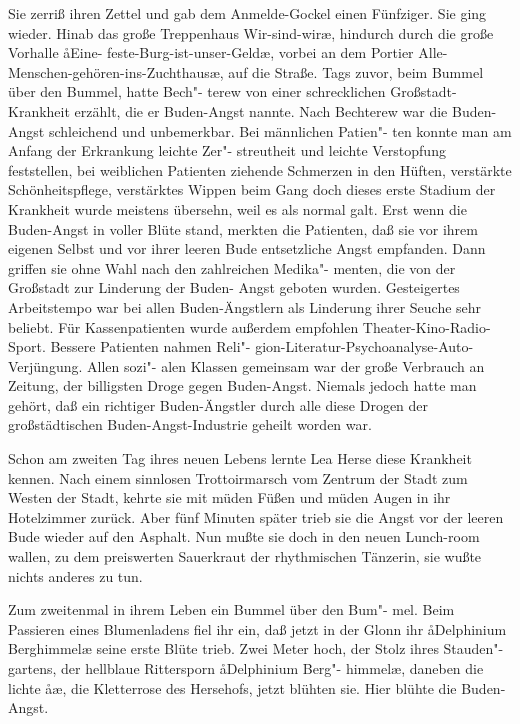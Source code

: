 Sie zerriß ihren Zettel und gab dem Anmelde-Gockel einen
Fünfziger. Sie ging wieder. Hinab das große Treppenhaus
\aanah{}Wir-sind-wir\ae{}, hindurch durch die große Vorhalle \aa{}Eine-%
feste-Burg-ist-unser-Geld\ae{}, vorbei an dem Portier \aanah{}Alle-%
Menschen-gehören-ins-Zuchthaus\ae{}, auf die Straße.
\abstand{}
Tags zuvor, beim Bummel über den Bummel, hatte Bech"-%
terew von einer schrecklichen Großstadt-Krankheit erzählt, die
er Buden-Angst nannte. Nach Bechterew war die Buden-%
Angst schleichend und unbemerkbar. Bei männlichen Patien"-%
ten konnte man am Anfang der Erkrankung leichte Zer"-%
streutheit und leichte Verstopfung feststellen, bei weiblichen
Patienten ziehende Schmerzen in den Hüften, verstärkte
Schönheitspflege, verstärktes Wippen beim Gang\dopp{} doch dieses
erste Stadium der Krankheit wurde meistens übersehn, weil
es als normal galt. Erst wenn die Buden-Angst in voller
Blüte stand, merkten die Patienten, daß sie vor ihrem eigenen
Selbst und vor ihrer leeren Bude entsetzliche Angst empfanden.
Dann griffen sie ohne Wahl nach den zahlreichen Medika"-%
menten, die von der Großstadt zur Linderung der Buden-%
Angst geboten wurden. Gesteigertes Arbeitstempo war bei
allen Buden-Ängstlern als Linderung ihrer Seuche sehr
beliebt. Für Kassenpatienten wurde außerdem empfohlen
Theater-Kino-Radio-Sport. Bessere Patienten nahmen Reli"-%
gion-Literatur-Psychoanalyse-Auto-Verjüngung. Allen sozi"-%
alen Klassen gemeinsam war der große Verbrauch an Zeitung,
der billigsten Droge gegen Buden-Angst. Niemals jedoch hatte
man gehört, daß ein richtiger Buden-Ängstler durch alle diese
Drogen der großstädtischen Buden-Angst-Industrie geheilt
worden war.

Schon am zweiten Tag ihres neuen Lebens lernte Lea Herse
diese Krankheit kennen. Nach einem sinnlosen Trottoirmarsch
vom Zentrum der Stadt zum Westen der Stadt, kehrte sie
mit müden Füßen und müden Augen in ihr Hotelzimmer
zurück. Aber fünf Minuten später trieb sie die Angst vor der
leeren Bude wieder auf den Asphalt. Nun mußte sie doch in den
neuen Lunch-room wallen, zu dem preiswerten Sauerkraut
der rhythmischen Tänzerin, sie wußte nichts anderes zu tun.

Zum zweitenmal in ihrem Leben ein Bummel über den Bum"-%
mel. Beim Passieren eines Blumenladens fiel ihr ein, daß
jetzt in der Glonn ihr \aa{}Delphinium Berghimmel\ae{} seine erste
Blüte trieb. Zwei Meter hoch, der Stolz ihres Stauden"-%
gartens, der hellblaue Rittersporn \aa{}Delphinium Berg"-%
himmel\ae{}, daneben die lichte \aa{}\ae{}, die
Kletterrose des Hersehofs, jetzt blühten sie. Hier blühte die
Buden-Angst.

